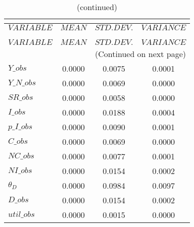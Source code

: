  
\begin{center}
\begin{longtable}{lccc} 
\caption{THEORETICAL MOMENTS}\\
 \label{Table:th_moments}\\
\toprule 
$VARIABLE    $	 & 	 $         MEAN$	 & 	 $    STD. DEV.$	 & 	 $     VARIANCE$\\
\midrule \endfirsthead 
\caption{(continued)}\\
 \toprule \\ 
$VARIABLE    $	 & 	 $         MEAN$	 & 	 $    STD. DEV.$	 & 	 $     VARIANCE$\\
\midrule \endhead 
\midrule \multicolumn{4}{r}{(Continued on next page)} \\ \bottomrule \endfoot 
\bottomrule \endlastfoot 
$Y\_obs      $	 & 	       0.0000	 & 	       0.0075	 & 	       0.0001 \\ 
$Y\_N\_obs   $	 & 	       0.0000	 & 	       0.0069	 & 	       0.0000 \\ 
$SR\_obs     $	 & 	       0.0000	 & 	       0.0058	 & 	       0.0000 \\ 
$I\_obs      $	 & 	       0.0000	 & 	       0.0188	 & 	       0.0004 \\ 
$p\_I\_obs   $	 & 	       0.0000	 & 	       0.0090	 & 	       0.0001 \\ 
$C\_obs      $	 & 	       0.0000	 & 	       0.0069	 & 	       0.0000 \\ 
$NC\_obs     $	 & 	       0.0000	 & 	       0.0077	 & 	       0.0001 \\ 
$NI\_obs     $	 & 	       0.0000	 & 	       0.0154	 & 	       0.0002 \\ 
${\theta_D}  $	 & 	       0.0000	 & 	       0.0984	 & 	       0.0097 \\ 
$D\_obs      $	 & 	       0.0000	 & 	       0.0154	 & 	       0.0002 \\ 
$util\_obs   $	 & 	       0.0000	 & 	       0.0015	 & 	       0.0000 \\ 
\end{longtable}
 \end{center}
